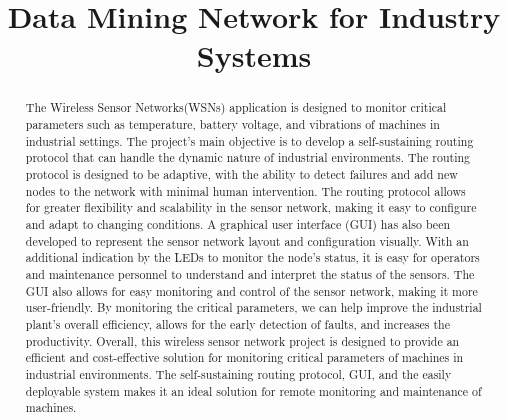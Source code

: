 \documentclass[conference]{IEEEtran}
\begin{document}
\title{Data Mining Network for Industry Systems}
\author{
\and
{}
\and
\centerline
{}
}

\maketitle

\begin{abstract}
The Wireless Sensor Networks(WSNs) application is designed to monitor critical parameters such as temperature, battery voltage, and vibrations of machines in industrial settings. The project's main objective is to develop a self-sustaining routing protocol that can handle the dynamic nature of industrial environments. The routing protocol is designed to be adaptive, with the ability to detect failures and add new nodes to the network with minimal human intervention. The routing protocol allows for greater flexibility and scalability in the sensor network, making it easy to configure and adapt to changing conditions. A graphical user interface (GUI) has also been developed to represent the sensor network layout and configuration visually. With an additional indication by the LEDs to monitor the node's status, it is easy for operators and maintenance personnel to understand and interpret the status of the sensors. The GUI also allows for easy monitoring and control of the sensor network, making it more user-friendly. By monitoring the critical parameters, we can help improve the industrial plant's overall efficiency, allows for the early detection of faults, and increases the productivity. Overall, this wireless sensor network project is designed to provide an efficient and cost-effective solution for monitoring critical parameters of machines in industrial environments. The self-sustaining routing protocol, GUI, and the easily deployable system makes it an ideal solution for remote monitoring and maintenance of machines.

\end{abstract}
\end{document}
